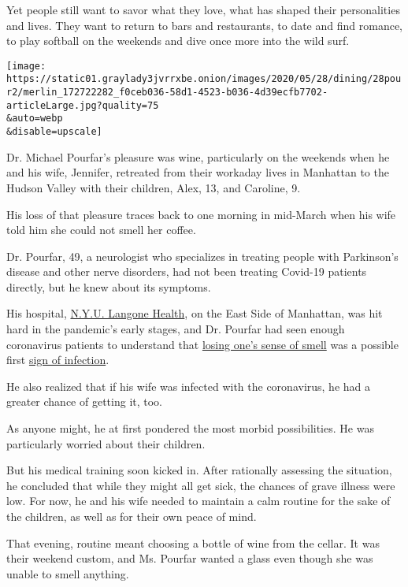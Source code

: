 Yet people still want to savor what they love, what has shaped their
personalities and lives. They want to return to bars and restaurants, to
date and find romance, to play softball on the weekends and dive once
more into the wild surf.

\texttt{[image: https://static01.graylady3jvrrxbe.onion/images/2020/05/28/dining/28pour2/merlin\_172722282\_f0ceb036-58d1-4523-b036-4d39ecfb7702-articleLarge.jpg?quality=75\\\&auto=webp\\\&disable=upscale]}

Dr. Michael Pourfar's pleasure was wine, particularly on the weekends
when he and his wife, Jennifer, retreated from their workaday lives in
Manhattan to the Hudson Valley with their children, Alex, 13, and
Caroline, 9.

His loss of that pleasure traces back to one morning in mid-March when
his wife told him she could not smell her coffee.

Dr. Pourfar, 49, a neurologist who specializes in treating people with
Parkinson's disease and other nerve disorders, had not been treating
Covid-19 patients directly, but he knew about its symptoms.

His hospital,
\href{https://www.nytimes3xbfgragh.onion/2020/04/29/nyregion/coronavirus-nyc-hospitals.html}{N.Y.U.
Langone Health}, on the East Side of Manhattan, was hit hard in the
pandemic's early stages, and Dr. Pourfar had seen enough coronavirus
patients to understand that
\href{https://www.nytimes3xbfgragh.onion/2020/03/22/health/coronavirus-symptoms-smell-taste.html}{losing
one's sense of smell} was a possible first
\href{https://www.the-scientist.com/news-opinion/loss-of-smell-taste-may-be-reliable-predictor-of-covid-19-study-67528}{sign
of infection}.

He also realized that if his wife was infected with the coronavirus, he
had a greater chance of getting it, too.

As anyone might, he at first pondered the most morbid possibilities. He
was particularly worried about their children.

But his medical training soon kicked in. After rationally assessing the
situation, he concluded that while they might all get sick, the chances
of grave illness were low. For now, he and his wife needed to maintain a
calm routine for the sake of the children, as well as for their own
peace of mind.

That evening, routine meant choosing a bottle of wine from the cellar.
It was their weekend custom, and Ms. Pourfar wanted a glass even though
she was unable to smell anything.

